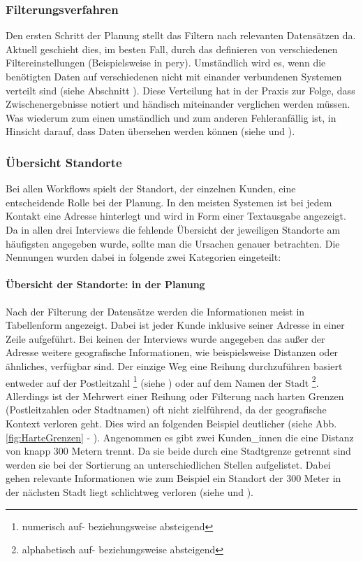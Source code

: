 \documentclass[Bachelorarbeit.tex]{subfiles}
\begin{document}
\subsubsection*{Filterungsverfahren}
\label{interviewsAnalyseFilterungsverfahren}
Den ersten Schritt der Planung stellt das Filtern nach relevanten Datensätzen da.
Aktuell geschieht dies, im besten Fall, durch das definieren von verschiedenen Filtereinstellungen (Beispielsweise in pery).
Umständlich wird es, wenn die benötigten Daten auf verschiedenen nicht mit einander verbundenen Systemen verteilt sind (siehe Abschnitt ). 
Diese Verteilung hat in der Praxis zur Folge, dass Zwischenergebnisse notiert und händisch miteinander verglichen werden müssen.
Was wiederum zum einen umständlich und zum anderen Fehleranfällig ist, in Hinsicht darauf, dass Daten übersehen werden können (siehe  und ).


\subsubsection*{Übersicht Standorte}
\label{interviewsAnalyseStandorte}
Bei allen Workflows spielt der Standort, der einzelnen Kunden, eine entscheidende Rolle bei der Planung.
In den meisten Systemen ist bei jedem Kontakt eine Adresse hinterlegt und wird in Form einer Textausgabe angezeigt.
Da in allen drei Interviews die fehlende Übersicht der jeweiligen Standorte am häufigsten angegeben wurde, sollte man die Ursachen genauer betrachten. 
Die Nennungen wurden dabei in folgende zwei Kategorien eingeteilt:

\paragraph{Übersicht der Standorte: in der Planung}
Nach der Filterung der Datensätze werden die Informationen meist in Tabellenform angezeigt.
Dabei ist jeder Kunde inklusive seiner Adresse in einer Zeile aufgeführt.
Bei keinen der Interviews wurde angegeben das außer der Adresse weitere geografische Informationen, wie beispielsweise Distanzen oder ähnliches, verfügbar sind.
Der einzige Weg eine Reihung durchzuführen basiert entweder auf der Postleitzahl
\footnote{
	numerisch auf- beziehungsweise absteigend
	} 
(siehe ) oder auf dem Namen der Stadt
\footnote{
	alphabetisch auf- beziehungsweise absteigend
	}. 
Allerdings ist der Mehrwert einer Reihung oder Filterung nach harten Grenzen (Postleitzahlen oder Stadtnamen) oft nicht zielführend, da der geografische Kontext verloren geht.
Dies wird an folgenden Beispiel deutlicher (siehe Abb. \ref{fig:HarteGrenzen} -  ). 
Angenommen es gibt zwei Kunden\_innen die eine Distanz von knapp 300 Metern trennt. 
Da sie beide durch eine Stadtgrenze getrennt sind werden sie bei der Sortierung an unterschiedlichen Stellen aufgelistet.
Dabei gehen relevante Informationen wie zum Beispiel ein Standort der 300 Meter in der nächsten Stadt liegt schlichtweg verloren (siehe  und ). 
 
\end{document}
